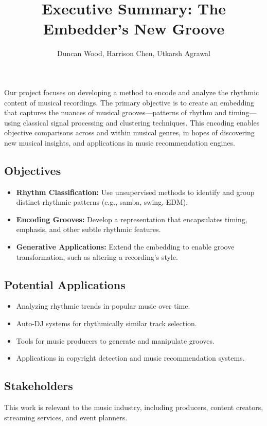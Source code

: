 \documentclass{article}
\begin{document}
\author{Duncan Wood, Harrison Chen, Utkarsh Agrawal}

\title{Executive Summary: The Embedder's New Groove}
\maketitle

Our project focuses on developing a method to encode and analyze the rhythmic content of musical recordings. The primary objective is to create an embedding that captures the nuances of musical grooves---patterns of rhythm and timing---using classical signal processing and clustering techniques. This encoding enables objective comparisons across and within musical genres, in hopes of discovering new musical insights, and applications in music recommendation engines.

\subsection*{Objectives}
\begin{itemize}
    \item \textbf{Rhythm Classification:} Use unsupervised methods to identify and group distinct rhythmic patterns (e.g., samba, swing, EDM).
    \item \textbf{Encoding Grooves:} Develop a representation that encapsulates timing, emphasis, and other subtle rhythmic features.
    \item \textbf{Generative Applications:} Extend the embedding to enable groove transformation, such as altering a recording’s style.
\end{itemize}

\subsection*{Potential Applications}
\begin{itemize}
    \item Analyzing rhythmic trends in popular music over time.
    \item Auto-DJ systems for rhythmically similar track selection.
    \item Tools for music producers to generate and manipulate grooves.
    \item Applications in copyright detection and music recommendation systems.
\end{itemize}

\subsection*{Stakeholders}
This work is relevant to the music industry, including producers, content creators, streaming services, and event planners.
\end{document}
